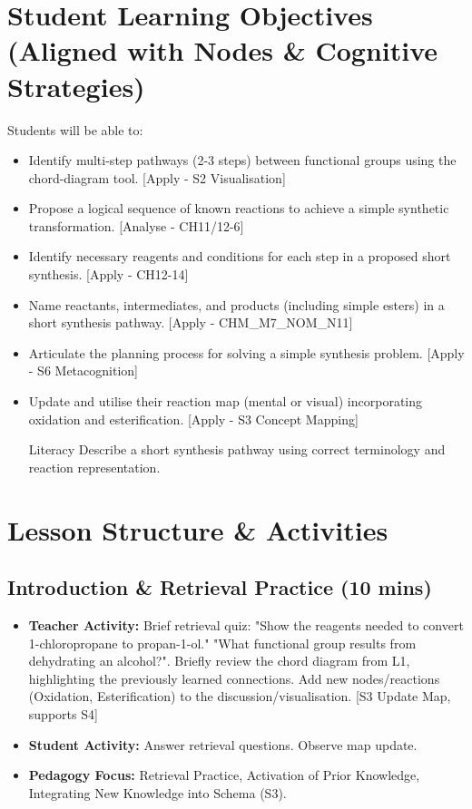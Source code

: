 \documentclass[11pt, a4paper]{article}
\begin{document}
\section*{Student Learning Objectives (Aligned with Nodes \& Cognitive Strategies)}
Students will be able to:
\begin{itemize}
    \item Identify multi-step pathways (2-3 steps) between functional groups using the chord-diagram tool. [Apply - S2 Visualisation]
    \item Propose a logical sequence of known reactions to achieve a simple synthetic transformation. [Analyse - CH11/12-6]
    \item Identify necessary reagents and conditions for each step in a proposed short synthesis. [Apply - CH12-14]
    \item Name reactants, intermediates, and products (including simple esters) in a short synthesis pathway. [Apply - CHM\_M7\_NOM\_N11]
    \item Articulate the planning process for solving a simple synthesis problem. [Apply - S6 Metacognition]
    \item Update and utilise their reaction map (mental or visual) incorporating oxidation and esterification. [Apply - S3 Concept Mapping]
    \item [Literacy] Describe a short synthesis pathway using correct terminology and reaction representation.
\end{itemize}

\section*{Lesson Structure \& Activities}

\subsection*{Introduction \& Retrieval Practice (10 mins)}
\begin{itemize}
    \item \textbf{Teacher Activity:} Brief retrieval quiz: "Show the reagents needed to convert 1-chloropropane to propan-1-ol." "What functional group results from dehydrating an alcohol?". Briefly review the chord diagram from L1, highlighting the previously learned connections. Add new nodes/reactions (Oxidation, Esterification) to the discussion/visualisation. [S3 Update Map, supports S4]
    \item \textbf{Student Activity:} Answer retrieval questions. Observe map update.
    \item \textbf{Pedagogy Focus:} Retrieval Practice, Activation of Prior Knowledge, Integrating New Knowledge into Schema (S3).
\end{itemize}
\end{document}

